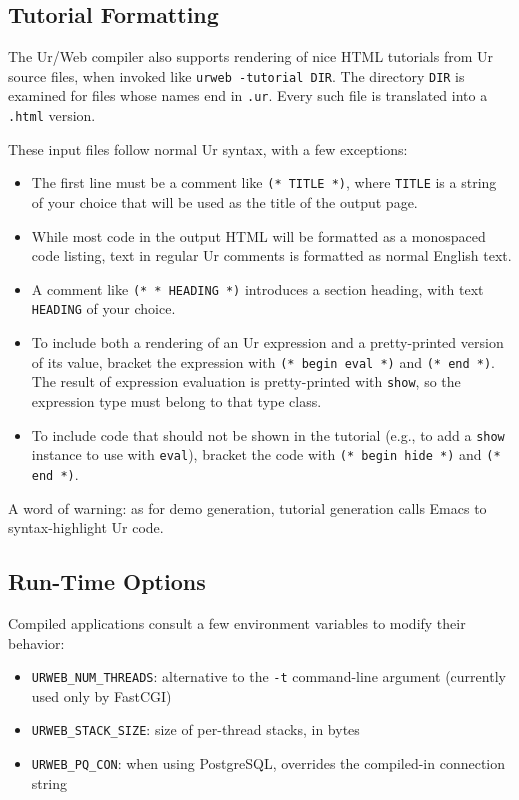 \documentclass{article}
\newcommand{\cd}[1]{\texttt{#1}}
\begin{document}
\subsection{Tutorial Formatting}

The Ur/Web compiler also supports rendering of nice HTML tutorials from Ur source files, when invoked like \cd{urweb -tutorial DIR}.  The directory \cd{DIR} is examined for files whose names end in \cd{.ur}.  Every such file is translated into a \cd{.html} version.

These input files follow normal Ur syntax, with a few exceptions:
\begin{itemize}
\item The first line must be a comment like \cd{(* TITLE *)}, where \cd{TITLE} is a string of your choice that will be used as the title of the output page.
\item While most code in the output HTML will be formatted as a monospaced code listing, text in regular Ur comments is formatted as normal English text.
\item A comment like \cd{(* * HEADING *)} introduces a section heading, with text \cd{HEADING} of your choice.
\item To include both a rendering of an Ur expression and a pretty-printed version of its value, bracket the expression with \cd{(* begin eval *)} and \cd{(* end *)}.  The result of expression evaluation is pretty-printed with \cd{show}, so the expression type must belong to that type class.
\item To include code that should not be shown in the tutorial (e.g., to add a \cd{show} instance to use with \cd{eval}), bracket the code with \cd{(* begin hide *)} and \cd{(* end *)}.
\end{itemize}

A word of warning: as for demo generation, tutorial generation calls Emacs to syntax-highlight Ur code.

\subsection{Run-Time Options}

Compiled applications consult a few environment variables to modify their behavior:

\begin{itemize}
  \item \cd{URWEB\_NUM\_THREADS}: alternative to the \cd{-t} command-line argument (currently used only by FastCGI)
  \item \cd{URWEB\_STACK\_SIZE}: size of per-thread stacks, in bytes
  \item \cd{URWEB\_PQ\_CON}: when using PostgreSQL, overrides the compiled-in connection string
\end{itemize}
\end{document}
